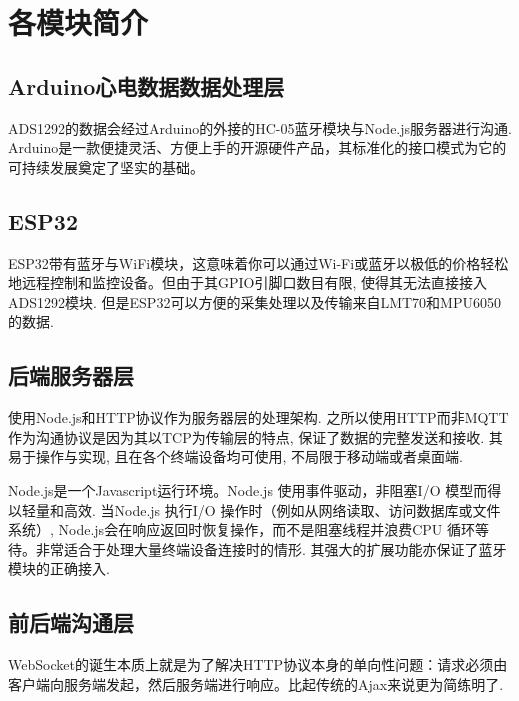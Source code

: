 \documentclass[scheme=chinese,a4paper]{article}
\begin{document}
\section{各模块简介}

\subsection{Arduino心电数据数据处理层}
ADS1292的数据会经过Arduino的外接的HC-05蓝牙模块与Node.js服务器进行沟通. Arduino是一款便捷灵活、方便上手的开源硬件产品，其标准化的接口模式为它的可持续发展奠定了坚实的基础。
\subsection{ESP32}
ESP32带有蓝牙与WiFi模块，这意味着你可以通过Wi-Fi或蓝牙以极低的价格轻松地远程控制和监控设备。但由于其GPIO引脚口数目有限, 使得其无法直接接入ADS1292模块. 但是ESP32可以方便的采集处理以及传输来自LMT70和MPU6050的数据. 

\subsection{后端服务器层}
使用Node.js和HTTP协议作为服务器层的处理架构. 之所以使用HTTP而非MQTT作为沟通协议是因为其以TCP为传输层的特点, 保证了数据的完整发送和接收.  其易于操作与实现, 且在各个终端设备均可使用, 不局限于移动端或者桌面端. 

Node.js是一个Javascript运行环境。Node.js 使用事件驱动，非阻塞I/O 模型而得以轻量和高效. 当Node.js 执行I/O 操作时（例如从网络读取、访问数据库或文件系统）,  Node.js会在响应返回时恢复操作，而不是阻塞线程并浪费CPU 循环等待。非常适合于处理大量终端设备连接时的情形. 其强大的扩展功能亦保证了蓝牙模块的正确接入. 
\subsection{前后端沟通层}
WebSocket的诞生本质上就是为了解决HTTP协议本身的单向性问题：请求必须由客户端向服务端发起，然后服务端进行响应。比起传统的Ajax来说更为简练明了. 
\end{document}

